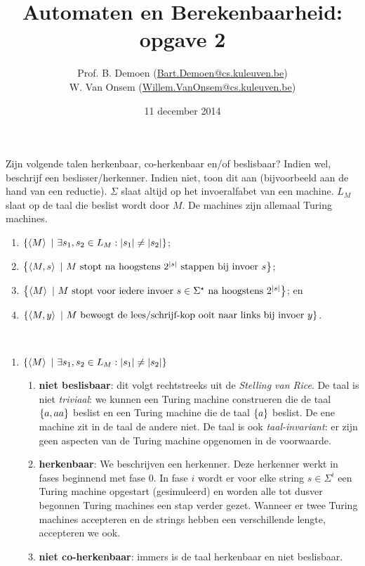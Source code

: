 \documentclass{article}
\title{Automaten en Berekenbaarheid:\\opgave 2}
\author{Prof. B. Demoen (\url{Bart.Demoen@cs.kuleuven.be})\\ W. Van Onsem (\url{Willem.VanOnsem@cs.kuleuven.be})}
\date{11 december 2014}
\begin{document}
\maketitle
\richtlijnen{}

\begin{question}[Berekenbaarheid]
Zijn volgende talen herkenbaar, co-herkenbaar en/of beslisbaar? Indien wel, beschrijf een beslisser/herkenner. Indien niet, toon dit aan (bijvoorbeeld aan de hand van een reductie). $\Sigma$ slaat altijd op het invoeralfabet van een machine. $L_M$ slaat op de taal die beslist wordt door $M$. De machines zijn allemaal Turing machines.
\begin{enumerate}
 \item $\left\{ \left\langle M \right\rangle\ |\ \exists s_1,s_2\in L_M:\left|s_1\right|\neq\left|s_2\right| \right\}$;
 \item $\left\{ \left\langle M,s \right\rangle\ |\ \mbox{$M$ stopt na hoogstens $2^{\left|s\right|}$ stappen bij invoer $s$} \right\}$;
 \item $\left\{ \left\langle M \right\rangle\ |\ \mbox{$M$ stopt voor iedere invoer $s\in\Sigma^{\star}$ na hoogstens $2^{\left|s\right|}$} \right\}$; en
 \item $\left\{ \left\langle M,y \right\rangle\ |\ \mbox{$M$ beweegt de lees/schrijf-kop ooit naar links bij invoer $y$} \right\}$.
\end{enumerate}
\begin{answer}~~
\begin{enumerate}
 \item $\left\{ \left\langle M \right\rangle\ |\ \exists s_1,s_2\in L_M:\left|s_1\right|\neq\left|s_2\right| \right\}$
 \begin{enumerate}
  \item \textbf{niet beslisbaar}: dit volgt rechtstreeks uit de \emph{Stelling van Rice}. De taal is niet \emph{triviaal}: we kunnen een Turing machine construeren die de taal $\left\{ a,aa \right\}$ beslist en een Turing machine die de taal $\left\{ a \right\}$ beslist. De ene machine zit in de taal de andere niet. De taal is ook \emph{taal-invariant}: er zijn geen aspecten van de Turing machine opgenomen in de voorwaarde.
  \item \label{itm:berekenexis}\textbf{herkenbaar}: We beschrijven een herkenner. Deze herkenner werkt in fases beginnend met fase $0$. In fase $i$ wordt er voor elke string $s\in\Sigma^i$ een Turing machine opgestart (gesimuleerd) en worden alle tot dusver begonnen Turing machines een stap verder gezet. Wanneer er twee Turing machines accepteren en de strings hebben een verschillende lengte, accepteren we ook.
  \item \textbf{niet co-herkenbaar}: immers is de taal herkenbaar en niet beslisbaar.

\end{enumerate}
\end{enumerate}
\end{answer}
\end{question}
\end{document}
